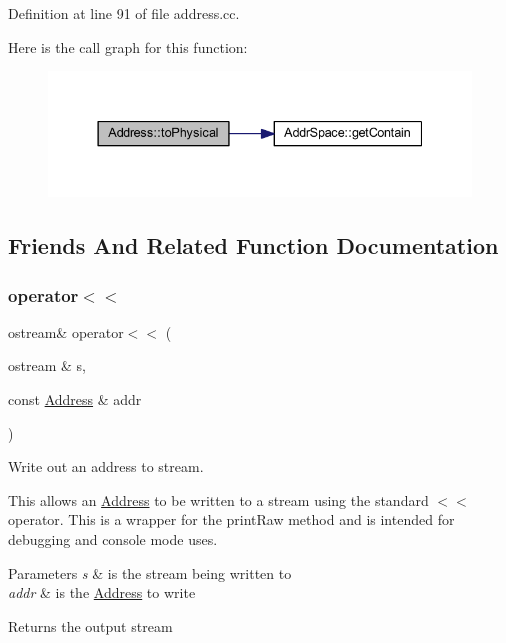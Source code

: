 Definition at line 91 of file address.\+cc.

Here is the call graph for this function\+:
\nopagebreak
\begin{figure}[H]
\begin{center}
\leavevmode
\includegraphics[width=337pt]{class_address_a5dfb849ac01e7b1ca87d0ecbf5022dca_cgraph}
\end{center}
\end{figure}


\subsection{Friends And Related Function Documentation}
\mbox{\label{class_address_aad61b7eee4f2506349c6a517a1271faa}} 
\subsubsection{\texorpdfstring{operator$<$$<$}{operator<<}}
{\footnotesize\ttfamily ostream\& operator$<$$<$ (\begin{DoxyParamCaption}\item[{ostream \&}]{s,  }\item[{const \mbox{\hyperlink{class_address}{Address}} \&}]{addr }\end{DoxyParamCaption})\hspace{0.3cm}{\ttfamily [friend]}}



Write out an address to stream. 

This allows an \mbox{\hyperlink{class_address}{Address}} to be written to a stream using the standard \textquotesingle{}$<$$<$\textquotesingle{} operator. This is a wrapper for the print\+Raw method and is intended for debugging and console mode uses. 
\begin{DoxyParams}{Parameters}
{\em s} & is the stream being written to \\
\hline
{\em addr} & is the \mbox{\hyperlink{class_address}{Address}} to write \\
\hline
\end{DoxyParams}
\begin{DoxyReturn}{Returns}
the output stream 
\end{DoxyReturn}


